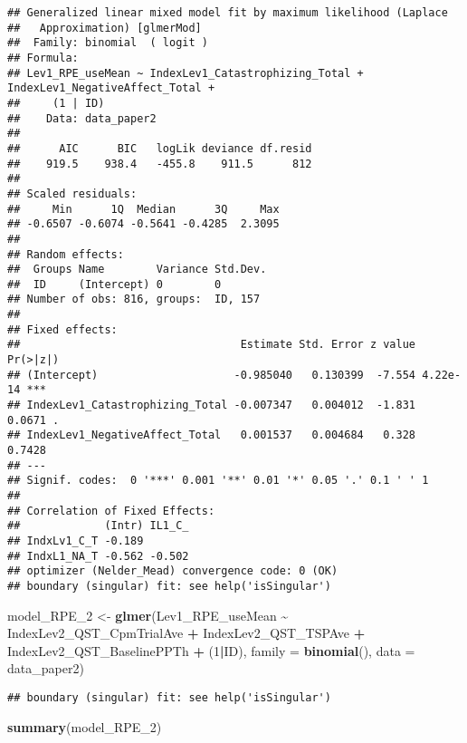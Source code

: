\documentclass[
  12pt,
]{article}
\newenvironment{Shaded}{\begin{snugshade}}{\end{snugshade}}
\newcommand{\AttributeTok}[1]{\textcolor[rgb]{0.13,0.29,0.53}{#1}}
\newcommand{\DecValTok}[1]{\textcolor[rgb]{0.00,0.00,0.81}{#1}}
\newcommand{\FunctionTok}[1]{\textcolor[rgb]{0.13,0.29,0.53}{\textbf{#1}}}
\newcommand{\NormalTok}[1]{#1}
\newcommand{\OtherTok}[1]{\textcolor[rgb]{0.56,0.35,0.01}{#1}}
\newcommand{\SpecialCharTok}[1]{\textcolor[rgb]{0.81,0.36,0.00}{\textbf{#1}}}
\begin{document}
\begin{verbatim}
## Generalized linear mixed model fit by maximum likelihood (Laplace
##   Approximation) [glmerMod]
##  Family: binomial  ( logit )
## Formula: 
## Lev1_RPE_useMean ~ IndexLev1_Catastrophizing_Total + IndexLev1_NegativeAffect_Total +  
##     (1 | ID)
##    Data: data_paper2
## 
##      AIC      BIC   logLik deviance df.resid 
##    919.5    938.4   -455.8    911.5      812 
## 
## Scaled residuals: 
##     Min      1Q  Median      3Q     Max 
## -0.6507 -0.6074 -0.5641 -0.4285  2.3095 
## 
## Random effects:
##  Groups Name        Variance Std.Dev.
##  ID     (Intercept) 0        0       
## Number of obs: 816, groups:  ID, 157
## 
## Fixed effects:
##                                  Estimate Std. Error z value Pr(>|z|)    
## (Intercept)                     -0.985040   0.130399  -7.554 4.22e-14 ***
## IndexLev1_Catastrophizing_Total -0.007347   0.004012  -1.831   0.0671 .  
## IndexLev1_NegativeAffect_Total   0.001537   0.004684   0.328   0.7428    
## ---
## Signif. codes:  0 '***' 0.001 '**' 0.01 '*' 0.05 '.' 0.1 ' ' 1
## 
## Correlation of Fixed Effects:
##             (Intr) IL1_C_
## IndxLv1_C_T -0.189       
## IndxL1_NA_T -0.562 -0.502
## optimizer (Nelder_Mead) convergence code: 0 (OK)
## boundary (singular) fit: see help('isSingular')
\end{verbatim}

\begin{Shaded}
\begin{Highlighting}[]
\NormalTok{model\_RPE\_2 }\OtherTok{\textless{}{-}} \FunctionTok{glmer}\NormalTok{(Lev1\_RPE\_useMean }\SpecialCharTok{\textasciitilde{}}\NormalTok{ IndexLev2\_QST\_CpmTrialAve }\SpecialCharTok{+}\NormalTok{ IndexLev2\_QST\_TSPAve }\SpecialCharTok{+}\NormalTok{ IndexLev2\_QST\_BaselinePPTh }\SpecialCharTok{+}\NormalTok{ (}\DecValTok{1}\SpecialCharTok{|}\NormalTok{ID), }\AttributeTok{family =} \FunctionTok{binomial}\NormalTok{(), }\AttributeTok{data =}\NormalTok{ data\_paper2)}
\end{Highlighting}
\end{Shaded}

\begin{verbatim}
## boundary (singular) fit: see help('isSingular')
\end{verbatim}

\begin{Shaded}
\begin{Highlighting}[]
\FunctionTok{summary}\NormalTok{(model\_RPE\_2)}
\end{Highlighting}
\end{Shaded}
\end{document}
